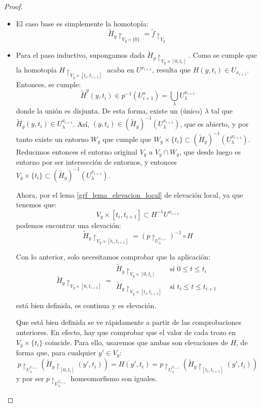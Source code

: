 \begin{lem}
\begin{proof}
		\begin{itemize}
			\item El caso base es simplemente la homotopía:
			\[\widetilde{H}_y\restriction_{V_y\times\{0\}}=\widetilde{f}\restriction_{V_y}\]
			
			\item Para el paso inductivo, supongamos dada $\widetilde{H}_y\restriction_{V_y\times [0,t_i]}$. Como se cumple que la homotopía $H\restriction_{V_y\times [t_i,t_{i+1}]}$ acaba en $U^{x_{i+1}}$, resulta que $H(y,t_i)\in U_{x_{i+1}}$. Entonces, se cumple:
			\[\widetilde{H}^y(y, t_i)\in p^{-1}(U^x_{i+1})=\bigcup_\lambda U_\lambda^{x_{i+1}}\]
			donde la unión es disjunta. De esta forma, existe un (único) $\lambda$ tal que $\widetilde{H}_y(y, t_i)\in U_\lambda^{x_{i+1}}$. Así, $(y,t_i)\in (\widetilde{H}_y)^{-1}(U_\lambda^{x_{i+1}})$, que es abierto, y por tanto existe un entorno $W_y$ que cumple que $W_y\times \{t_i\}\subset (\widetilde{H}_y)^{-1}(U_\lambda^{x_{i+1}})$. Reducimos entonces el entorno original $V_y$ a $V_y\cap W_y$, que desde luego es entorno por ser intersección de entornos, y entonces $V_y\times\{t_i\}\subset (\widetilde{H}_y)^{-1}(U_\lambda^{x_{i+1}})$.
			
			Ahora, por el lema \ref{grf_lema_elevacion_local} de elevación local, ya que tenemos que:
			\[V_y\times [t_i, t_{i+1}]\subset H^{-1} U^{x_{i+1}}\]
			podemos encontrar una elevación:
			\[\widetilde{H}_y\restriction_{V_y\times [t_i,t_{i+1}]} = (p\restriction_{U_\lambda^{x_{i+1}}})^{-1}\circ H \]
			
			Con lo anterior, solo necesitamos comprobar que la aplicación:
			\[\widetilde{H}_y\restriction_{V_y\times [0,t_{i+1}]} = \begin{array}{ll}
			\widetilde{H}_y\restriction_{V_y\times [0,t_i]} & \text{si } 0\leq t \leq t_i \\
			\widetilde{H}_y\restriction_{V_y\times [t_i,t_{i+1}]} & \text{si } t_i\leq t \leq t_{i+1} \\
			\end{array}\]
			está bien definida, es continua y es elevación. 
			
			Que está bien definida se ve rápidamente a partir de las comprobaciones anteriores. En efecto, hay que comprobar que el valor de cada trozo en $V_y\times\{t_i\}$ coincide. Para ello, usaremos que ambas son elevaciones de $H$, de forma que, para cualquier $y'\in V_y$:
			\[p\restriction_{U_\lambda^{x_{i+1}}}(\widetilde{H}_y\restriction_{[0,t_i]}(y',t_i)) = H(y',t_i) = p\restriction_{U_\lambda^{x_{i+1}}}(\widetilde{H}_y\restriction_{[t_i,t_{i+1}]}(y',t_i)) \]
			y por ser $p\restriction_{U_\lambda^{x_{i+1}}}$ homeomorfismo son iguales.
			

\end{itemize}
\end{proof}
\end{lem}
